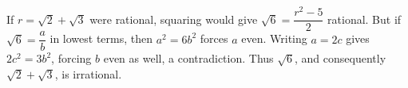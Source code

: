 If $r=\sqrt2+\sqrt3$ were rational, squaring would give $\sqrt6=\dfrac{r^2-5}{2}$ rational. But if $\sqrt6=\dfrac{a}{b}$ in lowest terms, then $a^2=6b^2$ forces $a$ even. Writing $a=2c$ gives $2c^2=3b^2$, forcing $b$ even as well, a contradiction. Thus $\sqrt6$, and consequently $\sqrt2+\sqrt3$, is irrational.
